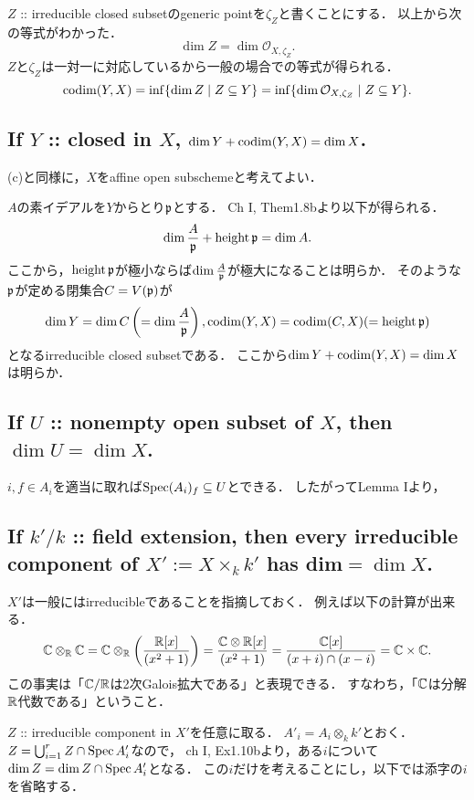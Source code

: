 \documentclass[a4paper]{jsarticle}
\newcommand{\shO}{\mathcal{O}}
\begin{document}
    $Z$ :: irreducible closed subsetのgeneric pointを$\zeta_Z$と書くことにする．
    以上から次の等式がわかった．
    \[ \dim Z=\dim \shO_{X,\zeta_Z}. \]
    $Z$と$\zeta_Z$は一対一に対応しているから一般の場合での等式が得られる．
    \[
        \codim(Y,X)
        =\inf \{ \dim Z \mid Z \subseteq Y \}
        =\inf \{ \dim \shO_{X,\zeta_Z} \mid Z \subseteq Y \}.
    \]

    \subsection{If $Y$ :: closed in $X$, $\dim Y+\operatorname{codim}(Y,X)=\dim X$.}
    (c)と同様に，$X$をaffine open subschemeと考えてよい．

    $A$の素イデアルを$Y$からとり$\mathfrak{p}$とする．
    Ch I, Them1.8bより以下が得られる．
    \[ \dim \frac{A}{\mathfrak{p}}+\operatorname{height} \mathfrak{p}=\dim A. \]
    ここから，$\operatorname{height} \mathfrak{p}$が極小ならば$\dim \frac{A}{\mathfrak{p}}$が極大になることは明らか．
    そのような$\mathfrak{p}$が定める閉集合$C=V(\mathfrak{p})$が
    \[ \dim Y=\dim C\left(=\dim \frac{A}{\mathfrak{p}}\right), \operatorname{codim} (Y,X)=\operatorname{codim}(C,X)(=\operatorname{height} \mathfrak{p}) \]
    となるirreducible closed subsetである．
    ここから$\dim Y+\operatorname{codim}(Y,X)=\dim X$は明らか．

    \subsection{If $U$ :: nonempty open subset of $X$, then $\dim U = \dim X$.}
    $i, f \in A_i$を適当に取れば$\operatorname{Spec} (A_i)_f \subseteq U$とできる．
    したがってLemma Iより，

    \subsection{If $k'/k$ :: field extension, then every irreducible component of $X':=X \times_k k'$ has dim$=\dim X$.}
    $X'$は一般にはirreducibleであることを指摘しておく．
    例えば以下の計算が出来る．
    \[
        \mathbb{C} \otimes_{\mathbb{R}} \mathbb{C}
        =\mathbb{C} \otimes_{\mathbb{R}} \left(\frac{\mathbb{R}[x]}{(x^2+1)}\right)
        =\frac{\mathbb{C} \otimes \mathbb{R}[x]}{(x^2+1)}
        =\frac{\mathbb{C}[x]}{(x+i) \cap (x-i)}
        =\mathbb{C} \times \mathbb{C}.
    \]
    この事実は「$\mathbb{C}/\mathbb{R}$は2次Galois拡大である」と表現できる．
    すなわち，「$\mathbb{C}$は分解$\mathbb{R}$代数である」ということ．

    $Z$ :: irreducible component in $X'$を任意に取る．
    $A'_i=A_i \otimes_k k'$とおく．
    $Z=\bigcup_{i=1}^r Z \cap \operatorname{Spec} A'_i$なので，
    ch I, Ex1.10bより，ある$i$について$\dim Z=\dim Z \cap \operatorname{Spec} A'_i$となる．
    この$i$だけを考えることにし，以下では添字の$i$を省略する．
\end{document}
